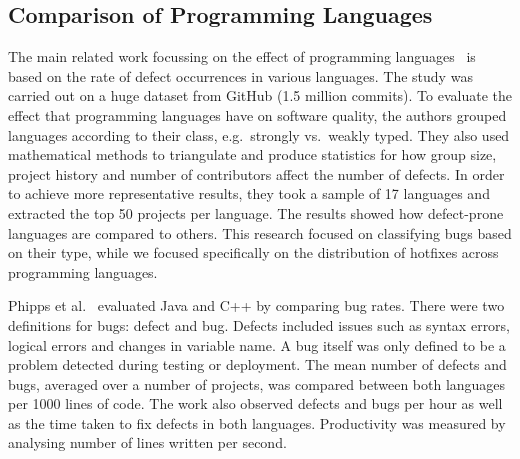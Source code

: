 \documentclass{sig-alternate}
\begin{document}


\subsection{Comparison of Programming Languages}


The main related work focussing on the effect of programming languages~\cite{Ray2014} is based on the rate of defect occurrences in various languages. The study was carried out on a huge dataset from GitHub (1.5 million commits). To evaluate the effect that programming languages have on software quality, the authors grouped languages according to their class, e.g.\ strongly vs.\ weakly typed. They also used mathematical methods to triangulate and produce statistics for how group size, project history and number of contributors affect the number of defects. In order to achieve more representative results, they took a sample of 17 languages and extracted the top 50 projects per language. The results showed how defect-prone languages are compared to others. This research focused on classifying bugs based on their type, while we focused specifically on the distribution of hotfixes across programming languages.

Phipps et al.~\cite{Phipps1999} evaluated Java and C++ by comparing bug rates. There were two definitions for bugs: defect and bug. Defects included issues such as syntax errors, logical errors and changes in variable name. A bug itself was only defined to be a problem detected during testing or deployment. The mean number of defects and bugs, averaged over a number of projects, was compared between both languages per 1000 lines of code. The work also observed defects and bugs per hour as well as the time taken to fix defects in both languages. Productivity was measured by analysing number of lines written per second.
\end{document}
